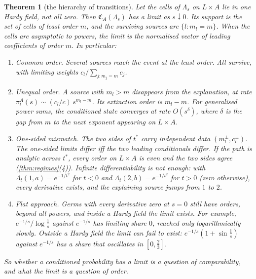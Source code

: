\documentclass[11pt]{article}
\newtheorem{theorem}{Theorem}\newtheorem{proposition}[theorem]{Proposition}\newtheorem{lemma}[theorem]{Lemma}\newtheorem{corollary}[theorem]{Corollary}\newtheorem{conjecture}[theorem]{Conjecture}
\theoremstyle{definition}\newtheorem{definition}[theorem]{Definition}\newtheorem{remark}[theorem]{Remark}\newtheorem{example}[theorem]{Example}
\begin{document}
\begin{theorem}[the hierarchy of transitions]\label{thm:hierarchy}
Let the cells of $\Lambda_s$ on $L\times A$ lie in one Hardy field, not all zero. Then $\mathfrak C_A(\Lambda_s)$ has a limit as $s\downarrow0$. Its support
is the set of cells of least order $m$, and the surviving sources are $\{l:m_l=m\}$. When the cells are asymptotic to powers, the limit is
the normalised vector of leading coefficients of order $m$. In particular:
\begin{enumerate}
\item[(1)] \emph{Common order.} Several sources reach the event at the least order. All survive, with limiting weights $c_l/\sum_{j:m_j=m}c_j$.
\item[(2)] \emph{Unequal order.} A source with $m_l>m$ disappears from the explanation, at rate $\pi^A_l(s)\sim(c_l/c)\,s^{m_l-m}$. Its
  \emph{extinction order} is $m_l-m$. For generalised power sums, the conditioned state converges at rate $O(s^\delta)$, where $\delta$ is the gap
  from $m$ to the next exponent appearing on $L\times A$.
\item[(3)] \emph{One-sided mismatch.} The two sides of $t^*$ carry independent data $(m^\pm_l,c^\pm_l)$. The one-sided limits differ iff the two
  leading conditionals differ. If the path is analytic across $t^*$, every order on $L\times A$ is even and the two sides agree
  (\cref{thm:regimes}(4)). Infinite differentiability is not enough: with $\Lambda_t(1,a)=e^{-1/t^2}$ for $t<0$ and $\Lambda_t(2,b)=e^{-1/t^2}$ for $t>0$
  (zero otherwise), every derivative exists, and the explaining source jumps from $1$ to $2$.
\item[(4)] \emph{Flat approach.} Germs with every derivative zero at $s=0$ still have orders, beyond all powers, and inside a Hardy field the
  limit exists. For example, $e^{-1/s}/\log\tfrac1s$ against $e^{-1/s}$ has limiting share $0$, reached only logarithmically slowly. Outside a
  Hardy field the limit can fail to exist: $e^{-1/s}(1+\sin\tfrac1s)$ against $e^{-1/s}$ has a share that oscillates in $[0,\tfrac23]$.
\end{enumerate}
So whether a conditioned probability has a limit is a question of comparability, and what the limit is a question of order.
\end{theorem}
\end{document}
